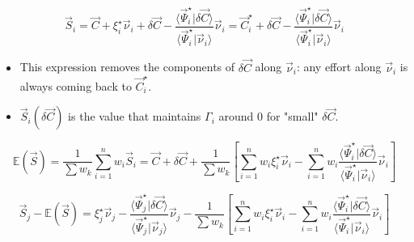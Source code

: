 \documentclass[aps,12pt]{revtex4}
\begin{document}
\begin{equation}
	\vec{S}_i = \vec{C} + \xi_i^\star \vec{\nu}_i
 + \delta\vec{C} - \dfrac{\langle \vec{\Psi}_i^\star \vert \delta\vec{C} \rangle}{\langle \vec{\Psi}_i^\star \vert \vec{\nu}_i \rangle
} \vec{\nu}_i = \vec{C}_i^\star + \delta\vec{C} - \dfrac{\langle \vec{\Psi}_i^\star \vert \delta\vec{C} \rangle}{\langle \vec{\Psi}_i^\star \vert \vec{\nu}_i \rangle
} \vec{\nu}_i
\end{equation} 

\begin{itemize}
\item This expression removes the components of $\delta\vec{C}$ along $\vec{\nu}_i$: any effort along $\vec{\nu}_i$ is always coming back to $\vec{C}_i^\star$.

\item $\vec{S}_i(\delta\vec{C})$ is the value that maintains $\Gamma_i$ around 0 for "small" $\delta\vec{C}$.

\end{itemize}
 
 
\begin{equation}
\mathbb{E}(\vec{S}) =
\dfrac{1}{\sum w_k}
   \sum_{i=1}^n  w_i \vec{S}_i = \vec{C} + \delta\vec{C} + 
   \dfrac{1}{\sum w_k}
   \left[ \sum_{i=1}^n 	w_i \xi_i^\star \vec{\nu}_i
	 -  \sum_{i=1}^n   w_i \dfrac{\langle \vec{\Psi}_i^\star \vert \delta\vec{C} \rangle}{\langle \vec{\Psi}_i^\star \vert \vec{\nu}_i \rangle
} \vec{\nu}_i \right]
\end{equation} 
 
\begin{equation}
	\vec{S}_j - \mathbb{E}(\vec{S}) = 
	\xi_j^\star \vec{\nu}_j 
	- \dfrac{\langle \vec{\Psi}_j^\star \vert \delta\vec{C} \rangle}{\langle \vec{\Psi}_j^\star \vert \vec{\nu}_j \rangle
} \vec{\nu}_j
 -
 \dfrac{1}{\sum w_k}
   \left[ \sum_{i=1}^n  w_i \xi_i^\star \vec{\nu}_i
	 -    \sum_{i=1}^n  w_i \dfrac{\langle \vec{\Psi}_i^\star \vert \delta\vec{C} \rangle}{\langle \vec{\Psi}_i^\star \vert \vec{\nu}_i \rangle
} \vec{\nu}_i \right]
\end{equation} 
 
\end{document}
